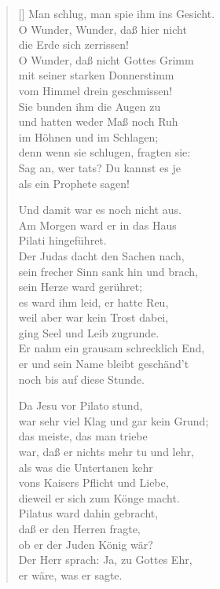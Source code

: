 \begin{multicols}{2}
\begin{verse}[\versewidth]
 Man schlug, man spie ihm ins Gesicht.\\
O Wunder, Wunder, daß hier nicht\\
die Erde sich zerrissen!\\
O Wunder, daß nicht Gottes Grimm\\
mit seiner starken Donnerstimm\\
vom Himmel drein geschmissen!\\
Sie bunden ihm die Augen zu\\
und hatten weder Maß noch Ruh\\
im Höhnen und im Schlagen;\\
denn wenn sie schlugen, fragten sie:\\
Sag an, wer tats? Du kannst es je\\
als ein Prophete sagen!

 Und damit war es noch nicht aus.\\
Am Morgen ward er in das Haus\\
Pilati hingeführet.\\
Der Judas dacht den Sachen nach,\\
sein frecher Sinn sank hin und brach,\\
sein Herze ward gerühret;\\
es ward ihm leid, er hatte Reu,\\
weil aber war kein Trost dabei,\\
ging Seel und Leib zugrunde.\\
Er nahm ein grausam schrecklich End,\\
er und sein Name bleibt geschänd't\\
noch bis auf diese Stunde.

 Da Jesu vor Pilato stund,\\
war sehr viel Klag und gar kein Grund;\\
das meiste, das man triebe\\
war, daß er nichts mehr tu und lehr,\\
als was die Untertanen kehr\\
vons Kaisers Pflicht und Liebe,\\
dieweil er sich zum Könge macht.\\
Pilatus ward dahin gebracht,\\
daß er den Herren fragte,\\
ob er der Juden König wär?\\
Der Herr sprach: Ja, zu Gottes Ehr,\\
er wäre, was er sagte.


\end{verse}
\end{multicols}
